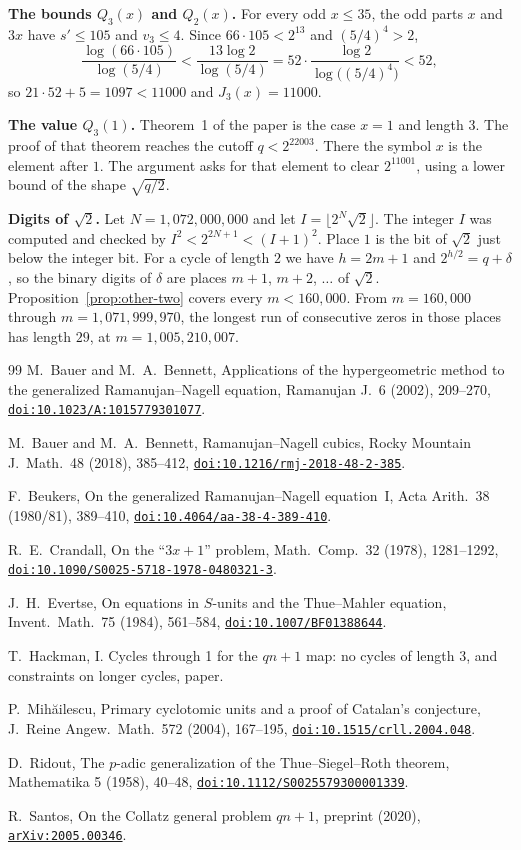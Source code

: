 \documentclass[11pt]{article}
\newcommand{\doilink}[1]{\href{https://doi.org/#1}{\nolinkurl{doi:#1}}}
\newcommand{\topic}[1]{\par\noindent\textbf{#1}}
\begin{document}
\topic{The bounds $Q_3(x)$ and $Q_2(x)$.}
For every odd $x \le 35$, the odd parts $x$ and $3x$ have $s' \le 105$ and $v_3 \le 4$.
Since $66 \cdot 105 < 2^{13}$ and $(5/4)^4 > 2$,
\[
\frac{\log(66 \cdot 105)}{\log(5/4)}
< \frac{13\log 2}{\log(5/4)}
= 52 \cdot \frac{\log 2}{\log\bigl((5/4)^4\bigr)}
< 52,
\]
so $21 \cdot 52 + 5 = 1097 < 11000$ and $J_3(x) = 11000$.

\topic{The value $Q_3(1)$.}
Theorem~1 of the paper is the case $x = 1$ and length $3$.
The proof of that theorem reaches the cutoff $q < 2^{22003}$.
There the symbol $x$ is the element after $1$.
The argument asks for that element to clear $2^{11001}$, using a lower bound of the shape $\sqrt{q/2}$.

\topic{Digits of $\sqrt{2}$.}
Let $N = 1{,}072{,}000{,}000$ and let $I = \lfloor 2^N \sqrt{2} \rfloor$.
The integer $I$ was computed and checked by $I^2 < 2^{2N+1} < (I+1)^2$.
Place $1$ is the bit of $\sqrt{2}$ just below the integer bit.
For a cycle of length $2$ we have $h = 2m + 1$ and $2^{h/2} = q + \delta$, so the binary digits of $\delta$ are places $m+1$, $m+2$, $\ldots$ of $\sqrt{2}$.
Proposition~\ref{prop:other-two} covers every $m < 160{,}000$.
From $m = 160{,}000$ through $m = 1{,}071{,}999{,}970$, the longest run of consecutive zeros in those places has length $29$, at $m = 1{,}005{,}210{,}007$.

\begin{thebibliography}{99}
M.~Bauer and M.~A.~Bennett, Applications of the hypergeometric method to the generalized Ramanujan--Nagell equation, Ramanujan J.\ 6 (2002), 209--270, \doilink{10.1023/A:1015779301077}.

M.~Bauer and M.~A.~Bennett, Ramanujan--Nagell cubics, Rocky Mountain J.\ Math.\ 48 (2018), 385--412, \doilink{10.1216/rmj-2018-48-2-385}.

F.~Beukers, On the generalized Ramanujan--Nagell equation~I, Acta Arith.\ 38 (1980/81), 389--410, \doilink{10.4064/aa-38-4-389-410}.

R.~E.~Crandall, On the ``$3x+1$'' problem, Math.\ Comp.\ 32 (1978), 1281--1292, \doilink{10.1090/S0025-5718-1978-0480321-3}.

J.~H.~Evertse, On equations in $S$-units and the Thue--Mahler equation, Invent.\ Math.\ 75 (1984), 561--584, \doilink{10.1007/BF01388644}.

T.~Hackman, I. Cycles through 1 for the $qn+1$ map: no cycles of length $3$, and constraints on longer cycles, paper.

P.~Mihăilescu, Primary cyclotomic units and a proof of Catalan's conjecture, J.~Reine Angew.~Math.~572 (2004), 167--195, \doilink{10.1515/crll.2004.048}.

D.~Ridout, The $p$-adic generalization of the Thue--Siegel--Roth theorem, Mathematika 5 (1958), 40--48, \doilink{10.1112/S0025579300001339}.

R.~Santos, On the Collatz general problem $qn+1$, preprint (2020), \href{https://arxiv.org/abs/2005.00346}{\nolinkurl{arXiv:2005.00346}}.

\end{thebibliography}
\end{document}
